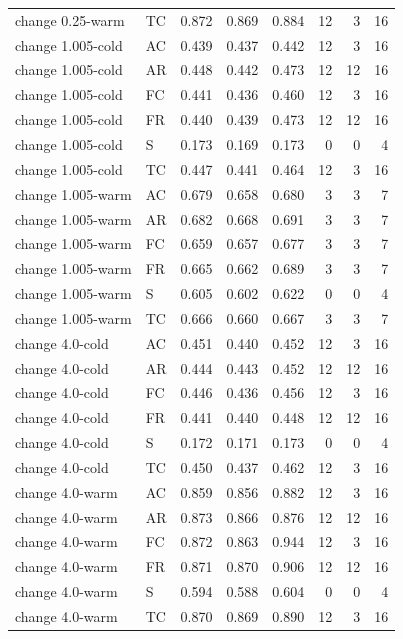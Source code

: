 \documentclass[ecta,nameyear,draft]{econsocart}
\theoremstyle{definition}
\theoremstyle{remark}
\begin{document}
\begin{longtable}{llrrrrrr}
change 0.25-warm & TC & 0.872 & 0.869 & 0.884 & 12 & 3 & 16\\
change 1.005-cold & AC & 0.439 & 0.437 & 0.442 & 12 & 3 & 16\\
change 1.005-cold & AR & 0.448 & 0.442 & 0.473 & 12 & 12 & 16\\
change 1.005-cold & FC & 0.441 & 0.436 & 0.460 & 12 & 3 & 16\\
change 1.005-cold & FR & 0.440 & 0.439 & 0.473 & 12 & 12 & 16\\
change 1.005-cold & S & 0.173 & 0.169 & 0.173 & 0 & 0 & 4\\
change 1.005-cold & TC & 0.447 & 0.441 & 0.464 & 12 & 3 & 16\\
change 1.005-warm & AC & 0.679 & 0.658 & 0.680 & 3 & 3 & 7\\
change 1.005-warm & AR & 0.682 & 0.668 & 0.691 & 3 & 3 & 7\\
change 1.005-warm & FC & 0.659 & 0.657 & 0.677 & 3 & 3 & 7\\
change 1.005-warm & FR & 0.665 & 0.662 & 0.689 & 3 & 3 & 7\\
change 1.005-warm & S & 0.605 & 0.602 & 0.622 & 0 & 0 & 4\\
change 1.005-warm & TC & 0.666 & 0.660 & 0.667 & 3 & 3 & 7\\
change 4.0-cold & AC & 0.451 & 0.440 & 0.452 & 12 & 3 & 16\\
change 4.0-cold & AR & 0.444 & 0.443 & 0.452 & 12 & 12 & 16\\
change 4.0-cold & FC & 0.446 & 0.436 & 0.456 & 12 & 3 & 16\\
change 4.0-cold & FR & 0.441 & 0.440 & 0.448 & 12 & 12 & 16\\
change 4.0-cold & S & 0.172 & 0.171 & 0.173 & 0 & 0 & 4\\
change 4.0-cold & TC & 0.450 & 0.437 & 0.462 & 12 & 3 & 16\\
change 4.0-warm & AC & 0.859 & 0.856 & 0.882 & 12 & 3 & 16\\
change 4.0-warm & AR & 0.873 & 0.866 & 0.876 & 12 & 12 & 16\\
change 4.0-warm & FC & 0.872 & 0.863 & 0.944 & 12 & 3 & 16\\
change 4.0-warm & FR & 0.871 & 0.870 & 0.906 & 12 & 12 & 16\\
change 4.0-warm & S & 0.594 & 0.588 & 0.604 & 0 & 0 & 4\\
change 4.0-warm & TC & 0.870 & 0.869 & 0.890 & 12 & 3 & 16\\
\bottomrule\end{longtable}
\end{document}
